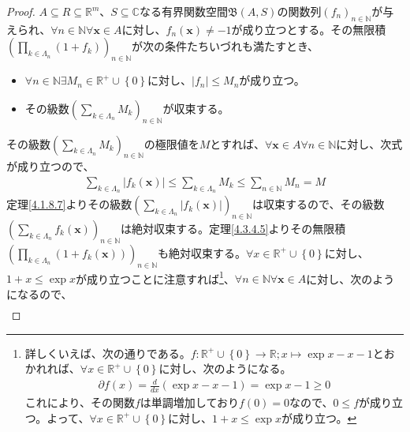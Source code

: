 \documentclass[dvipdfmx]{jsarticle}
\begin{document}
\begin{proof}
$A \subseteq R \subseteq \mathbb{R}^{m}$、$S \subseteq \mathbb{C}$なる有界関数空間$\mathfrak{B}(A,S)$の関数列$\left( f_{n} \right)_{n \in \mathbb{N}}$が与えられ、$\forall n \in \mathbb{N}\forall\mathbf{x} \in A$に対し、$f_{n}\left( \mathbf{x} \right) \neq - 1$が成り立つとする。その無限積$\left( \prod_{k \in \varLambda_{n}} \left( 1 + f_{k} \right) \right)_{n \in \mathbb{N}}$が次の条件たちいづれも満たすとき、
\begin{itemize}
\item
  $\forall n \in \mathbb{N}\exists M_{n} \in \mathbb{R}^{+} \cup \left\{ 0 \right\}$に対し、$\left| f_{n} \right| \leq M_{n}$が成り立つ。
\item
  その級数$\left( \sum_{k \in \varLambda_{n}} M_{k} \right)_{n \in \mathbb{N}}$が収束する。
\end{itemize}
その級数$\left( \sum_{k \in \varLambda_{n}} M_{k} \right)_{n \in \mathbb{N}}$の極限値を$M$とすれば、$\forall\mathbf{x} \in A\forall n \in \mathbb{N}$に対し、次式が成り立つので、
\begin{align*}
\sum_{k \in \varLambda_{n}} \left| f_{k}\left( \mathbf{x} \right) \right| \leq \sum_{k \in \varLambda_{n}} M_{k} \leq \sum_{n \in \mathbb{N}} M_{n} = M
\end{align*}
定理\ref{4.1.8.7}よりその級数$\left( \sum_{k \in \varLambda_{n}} \left| f_{k}\left( \mathbf{x} \right) \right| \right)_{n \in \mathbb{N}}$は収束するので、その級数$\left( \sum_{k \in \varLambda_{n}} {f_{k}\left( \mathbf{x} \right)} \right)_{n \in \mathbb{N}}$は絶対収束する。定理\ref{4.3.4.5}よりその無限積$\left( \prod_{k \in \varLambda_{n}} \left( 1 + f_{k}\left( \mathbf{x} \right) \right) \right)_{n \in \mathbb{N}}$も絶対収束する。$\forall x \in \mathbb{R}^{+} \cup \left\{ 0 \right\}$に対し、$1 + x \leq \exp x$が成り立つことに注意すれば\footnote{詳しくいえば、次の通りである。$f:\mathbb{R}^{+} \cup \left\{ 0 \right\} \rightarrow \mathbb{R};x \mapsto \exp x - x - 1$とおかれれば、$\forall x \in \mathbb{R}^{+} \cup \left\{ 0 \right\}$に対し、次のようになる。
\begin{align*}
\partial f(x) = \frac{d}{dx}\left( \exp x - x - 1 \right) = \exp x - 1 \geq 0
\end{align*}
これにより、その関数$f$は単調増加しており$f(0) = 0$なので、$0 \leq f$が成り立つ。よって、$\forall x \in \mathbb{R}^{+} \cup \left\{ 0 \right\}$に対し、$1 + x \leq \exp x$が成り立つ。}、$\forall n \in \mathbb{N}\forall\mathbf{x} \in A$に対し、次のようになるので、
\begin{align*}

\end{align*}
\end{proof}
\end{document}
